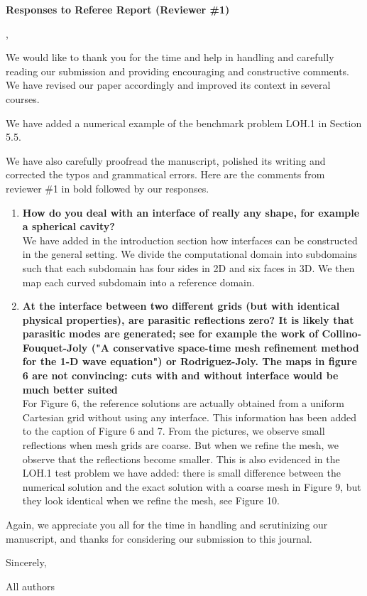 \documentclass[twoside,11pt]{article}
\begin{document}
\begin{center}
{\Large \textbf{Responses to Referee Report (Reviewer \#1)}}
\end{center}

,

We would like to thank you for the time and help in handling and carefully reading our submission and providing encouraging and constructive comments.  We have revised our paper accordingly and improved its context in several courses. 

We have added a numerical example of the benchmark problem LOH.1 in Section 5.5.

We have also carefully proofread the manuscript, polished its writing and corrected the typos and grammatical errors.  Here are the comments from reviewer \#1 in bold followed by our responses.

\begin{enumerate}
\item \textbf{How do you deal with an interface of really any shape, for example a spherical cavity?}\\
 We have added in the introduction section how interfaces can be constructed in the general setting. We divide the computational domain into subdomains such that each subdomain has four sides in 2D and six faces in 3D. We then map each curved subdomain into a reference domain.

\item  \textbf{At the interface between two different grids (but with identical physical properties), are parasitic reflections zero? It is likely that parasitic modes are generated; see for example the work of Collino-Fouquet-Joly ("A conservative space-time mesh refinement method for the 1-D wave equation") or Rodriguez-Joly. The maps in figure 6 are not convincing: cuts with and without interface would be much better suited}\\
 For Figure 6, the reference solutions are actually obtained from a uniform Cartesian grid without using any interface. This information has been added to the caption of Figure 6 and 7. From the pictures, we observe small reflections when mesh grids are coarse. But when we refine the mesh, we observe that the reflections become smaller. This is also evidenced in the LOH.1 test problem we have added: there is small difference between the numerical solution and the exact solution with a coarse mesh in Figure 9, but they look identical when we refine the mesh, see Figure 10.%

\end{enumerate}

Again, we appreciate you all for the time in handling and scrutinizing our manuscript, and thanks for considering our submission to this journal.

Sincerely, 

All authors
\end{document}
